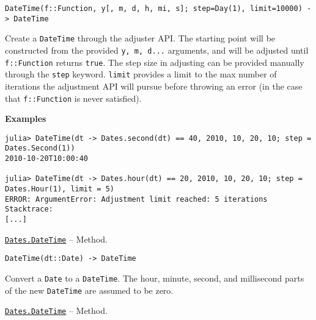 \begin{adjustwidth}{2em}{0pt}


\begin{verbatim}
DateTime(f::Function, y[, m, d, h, mi, s]; step=Day(1), limit=10000) -> DateTime
\end{verbatim}

Create a \texttt{DateTime} through the adjuster API. The starting point will be constructed from the provided \texttt{y, m, d...} arguments, and will be adjusted until \texttt{f::Function} returns \texttt{true}. The step size in adjusting can be provided manually through the \texttt{step} keyword. \texttt{limit} provides a limit to the max number of iterations the adjustment API will pursue before throwing an error (in the case that \texttt{f::Function} is never satisfied).

\textbf{Examples}


\begin{verbatim}
julia> DateTime(dt -> Dates.second(dt) == 40, 2010, 10, 20, 10; step = Dates.Second(1))
2010-10-20T10:00:40

julia> DateTime(dt -> Dates.hour(dt) == 20, 2010, 10, 20, 10; step = Dates.Hour(1), limit = 5)
ERROR: ArgumentError: Adjustment limit reached: 5 iterations
Stacktrace:
[...]
\end{verbatim}



\end{adjustwidth}
\hypertarget{12066645755218970960}{}
\hyperlink{12066645755218970960}{\texttt{Dates.DateTime}}  -- {Method.}

\begin{adjustwidth}{2em}{0pt}


\begin{verbatim}
DateTime(dt::Date) -> DateTime
\end{verbatim}

Convert a \texttt{Date} to a \texttt{DateTime}. The hour, minute, second, and millisecond parts of the new \texttt{DateTime} are assumed to be zero.



\end{adjustwidth}
\hypertarget{3642697821644386116}{}
\hyperlink{3642697821644386116}{\texttt{Dates.DateTime}}  -- {Method.}

